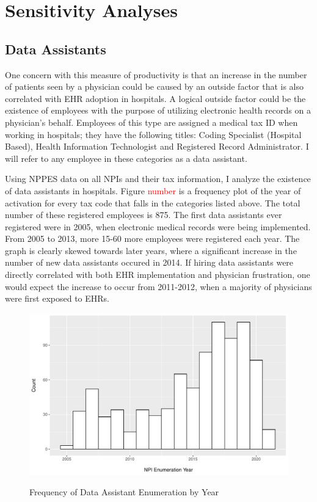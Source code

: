 \documentclass[11pt]{article}
\begin{document}
\section{Sensitivity Analyses}

\subsection{Data Assistants}

One concern with this measure of productivity is that an increase in the number of patients seen by a physician could be caused by an outside factor that is also correlated with EHR adoption in hospitals. A logical outside factor could be the existence of employees with the purpose of utilizing electronic health records on a physician's behalf. Employees of this type are assigned a medical tax ID when working in hospitals; they have the following titles: Coding Specialist (Hospital Based), Health Information Technologist and Registered Record Administrator. I will refer to any employee in these categories as a data assistant. 

Using NPPES data on all NPIs and their tax information, I analyze the existence of data assistants in hospitals. Figure \textcolor{red}{number} is a frequency plot of the year of activation for every tax code that falls in the categories listed above. The total number of these registered employees is 875. The first data assistants ever registered were in 2005, when electronic medical records were being implemented. From 2005 to 2013, more 15-60 more employees were registered each year. The graph is clearly skewed towards later years, where a significant increase in the number of new data assistants occured in 2014. If hiring data assistants were directly correlated with both EHR implementation and physician frustration, one would expect the increase to occur from 2011-2012, when a majority of physicians were first exposed to EHRs. 


\vspace{5mm}
\begin{figure}[ht]
\centering
\caption{Frequency of Data Assistant Enumeration by Year}
\includegraphics[scale=.5]{Objects/dataassistant_histogram.pdf}
    \label{fig:dataassistant_histogram}
\end{figure}
\end{document}
